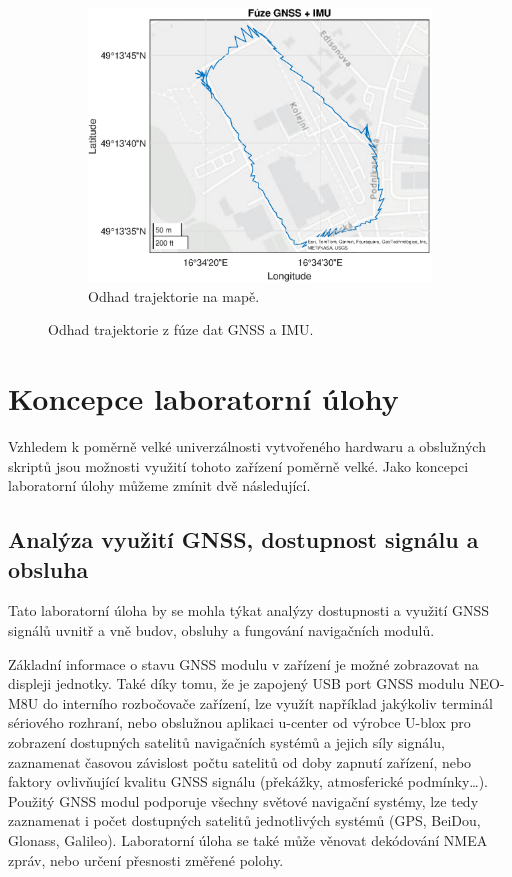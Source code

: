 \begin{figure}[h]
\begin{subfigure}[b]{0.49\textwidth}
     \end{subfigure}
     \hfill
     \centering
     \begin{subfigure}[b]{0.49\textwidth}
         \centering
         \includegraphics[width=\textwidth]{obrazky/matlab/2gnssIMU}
         \caption{Odhad trajektorie na mapě.}   
         
     \end{subfigure}
     
     \caption{Odhad trajektorie z fúze dat GNSS a IMU.}
     \label{fig:gnnsIMUFusion}  
\end{figure}

\chapter{Koncepce laboratorní úlohy}
Vzhledem k poměrně velké univerzálnosti vytvořeného hardwaru a obslužných skriptů jsou možnosti využití tohoto zařízení poměrně velké. Jako koncepci laboratorní úlohy můžeme zmínit dvě následující.
\section{Analýza využití GNSS, dostupnost signálu a obsluha}
Tato laboratorní úloha by se mohla týkat analýzy dostupnosti a využití GNSS signálů uvnitř a vně budov, obsluhy a fungování navigačních modulů. 

Základní informace o stavu GNSS modulu v zařízení je možné zobrazovat na displeji jednotky. Také díky tomu, že je zapojený USB port GNSS modulu NEO-M8U do interního rozbočovače zařízení, lze využít například jakýkoliv terminál sériového rozhraní, nebo obslužnou aplikaci u-center od výrobce U-blox pro zobrazení dostupných satelitů navigačních systémů a jejich síly signálu, zaznamenat časovou závislost počtu satelitů od doby zapnutí zařízení, nebo faktory ovlivňující kvalitu GNSS signálu (překážky, atmosferické podmínky\ldots). Použitý GNSS modul podporuje všechny světové navigační systémy, lze tedy zaznamenat i počet dostupných satelitů jednotlivých systémů (GPS, BeiDou, Glonass, Galileo). Laboratorní úloha se také může věnovat dekódování NMEA zpráv, nebo určení přesnosti změřené polohy.

